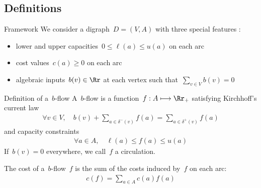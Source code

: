 \documentclass{beamer}
\begin{document}
\subsection{Definitions}

\begin{frame}[t]{Framework}  \pause
We consider a digraph~$D = (V, A)$ with three special features : \pause
\begin{itemize}
  \item lower and upper capacities~$0 \leq \ell(a) \leq u(a)$ on each arc \pause
  \item cost values~$c(a) \geq 0$ on each arc \pause
  \item algebraic inputs~$b(v) \in \Rr$ at each vertex such that~$\sum_{v \in V} b(v) = 0$
\end{itemize}
\end{frame}

\begin{frame}[t]{Definition of a~$b$-flow} \pause
  A~$b$-flow is a function~$f: A \longmapsto \Rr_+$ satisfying Kirchhoff's current law
  \begin{align*}
    \forall v \in V, \quad b(v) + \sum_{a \in \delta^-(v)} f(a) = \sum_{a \in \delta^+(v)} f(a)
  \end{align*} \pause
  and capacity constraints
  \begin{align*}
    \forall a \in A, \quad \ell(a) \leq f(a) \leq u(a)
  \end{align*} \pause
  If~$b(v) = 0$ everywhere, we call~$f$ a circulation.
  
  \medskip \pause
  
  The cost of a~$b$-flow~$f$ is the sum of the costs induced by~$f$ on each arc:
  \begin{align*}
    c(f) = \sum_{a \in A} c(a) f(a)
  \end{align*}
\end{frame}
\end{document}
